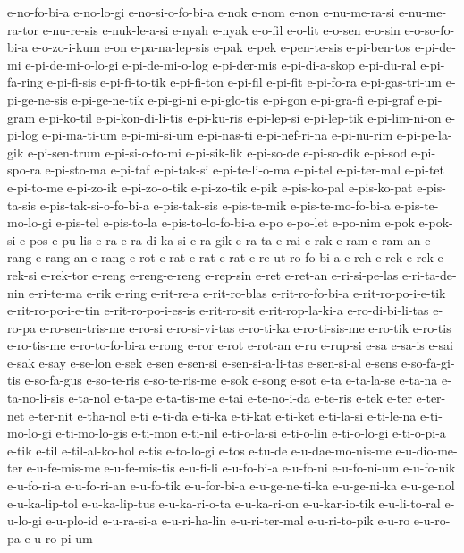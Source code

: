 {e-no-fo-bi-a e-no-lo-gi e-no-si-o-fo-bi-a e-nok e-nom e-non e-nu-me-ra-si
e-nu-me-ra-tor e-nu-re-sis e-nuk-le-a-si e-nyah e-nyak e-o-fil e-o-lit
e-o-sen e-o-sin e-o-so-fo-bi-a e-o-zo-i-kum e-on e-pa-na-lep-sis e-pak
e-pek e-pen-te-sis e-pi-ben-tos e-pi-de-mi e-pi-de-mi-o-lo-gi
e-pi-de-mi-o-log e-pi-der-mis e-pi-di-a-skop e-pi-du-ral e-pi-fa-ring
e-pi-fi-sis e-pi-fi-to-tik e-pi-fi-ton e-pi-fil e-pi-fit e-pi-fo-ra
e-pi-gas-tri-um e-pi-ge-ne-sis e-pi-ge-ne-tik e-pi-gi-ni e-pi-glo-tis
e-pi-gon e-pi-gra-fi e-pi-graf e-pi-gram e-pi-ko-til e-pi-kon-di-li-tis
e-pi-ku-ris e-pi-lep-si e-pi-lep-tik e-pi-lim-ni-on e-pi-log e-pi-ma-ti-um
e-pi-mi-si-um e-pi-nas-ti e-pi-nef-ri-na e-pi-nu-rim e-pi-pe-la-gik
e-pi-sen-trum e-pi-si-o-to-mi e-pi-sik-lik e-pi-so-de e-pi-so-dik e-pi-sod
e-pi-spo-ra e-pi-sto-ma e-pi-taf e-pi-tak-si e-pi-te-li-o-ma e-pi-tel
e-pi-ter-mal e-pi-tet e-pi-to-me e-pi-zo-ik e-pi-zo-o-tik e-pi-zo-tik
e-pik e-pis-ko-pal e-pis-ko-pat e-pis-ta-sis e-pis-tak-si-o-fo-bi-a
e-pis-tak-sis e-pis-te-mik e-pis-te-mo-fo-bi-a e-pis-te-mo-lo-gi e-pis-tel
e-pis-to-la e-pis-to-lo-fo-bi-a e-po e-po-let e-po-nim e-pok e-pok-si
e-pos e-pu-lis e-ra e-ra-di-ka-si e-ra-gik e-ra-ta e-rai e-rak e-ram
e-ram-an e-rang e-rang-an e-rang-e-rot e-rat e-rat-e-rat
e-re-ut-ro-fo-bi-a e-reh e-rek-e-rek e-rek-si e-rek-tor e-reng
e-reng-e-reng e-rep-sin e-ret e-ret-an e-ri-si-pe-las e-ri-ta-de-nin
e-ri-te-ma e-rik e-ring e-rit-re-a e-rit-ro-blas e-rit-ro-fo-bi-a
e-rit-ro-po-i-e-tik e-rit-ro-po-i-e-tin e-rit-ro-po-i-es-is e-rit-ro-sit
e-rit-rop-la-ki-a e-ro-di-bi-li-tas e-ro-pa e-ro-sen-tris-me e-ro-si
e-ro-si-vi-tas e-ro-ti-ka e-ro-ti-sis-me e-ro-tik e-ro-tis e-ro-tis-me
e-ro-to-fo-bi-a e-rong e-ror e-rot e-rot-an e-ru e-rup-si e-sa e-sa-is
e-sai e-sak e-say e-se-lon e-sek e-sen e-sen-si e-sen-si-a-li-tas
e-sen-si-al e-sens e-so-fa-gi-tis e-so-fa-gus e-so-te-ris e-so-te-ris-me
e-sok e-song e-sot e-ta e-ta-la-se e-ta-na e-ta-no-li-sis e-ta-nol e-ta-pe
e-ta-tis-me e-tai e-te-no-i-da e-te-ris e-tek e-ter e-ter-net e-ter-nit
e-tha-nol e-ti e-ti-da e-ti-ka e-ti-kat e-ti-ket e-ti-la-si e-ti-le-na
e-ti-mo-lo-gi e-ti-mo-lo-gis e-ti-mon e-ti-nil e-ti-o-la-si e-ti-o-lin
e-ti-o-lo-gi e-ti-o-pi-a e-tik e-til e-til-al-ko-hol e-tis e-to-lo-gi
e-tos e-tu-de e-u-dae-mo-nis-me e-u-dio-me-ter e-u-fe-mis-me
e-u-fe-mis-tis e-u-fi-li e-u-fo-bi-a e-u-fo-ni e-u-fo-ni-um e-u-fo-nik
e-u-fo-ri-a e-u-fo-ri-an e-u-fo-tik e-u-for-bi-a e-u-ge-ne-ti-ka
e-u-ge-ni-ka e-u-ge-nol e-u-ka-lip-tol e-u-ka-lip-tus e-u-ka-ri-o-ta
e-u-ka-ri-on e-u-kar-io-tik e-u-li-to-ral e-u-lo-gi e-u-plo-id e-u-ra-si-a
e-u-ri-ha-lin e-u-ri-ter-mal e-u-ri-to-pik e-u-ro e-u-ro-pa e-u-ro-pi-um
}
